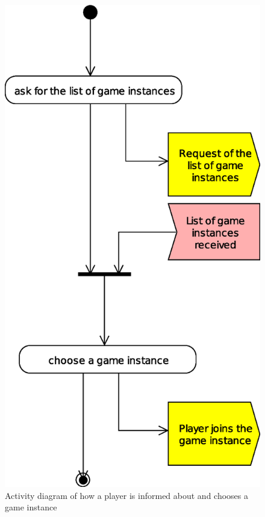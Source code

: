 \begin{figure}[htbp!]
\begin{center}
\includegraphics[scale=0.5]{Figures/_integration_activity_be_informed_new_game_instance}
\caption{Activity diagram of how a player is informed about and
  chooses a game instance}
\label{F_integration_activity_be_informed_new_game_instance}
\end{center}
\end{figure}

